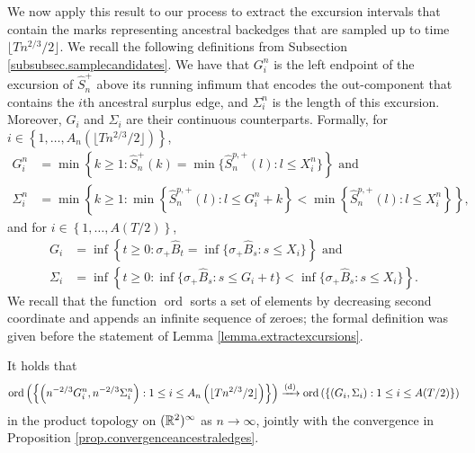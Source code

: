 We now apply this result to our process to extract the excursion intervals that contain the marks representing ancestral backedges that are sampled up to time $\lfloor Tn^{2/3}/2\rfloor$.  We recall the following definitions from Subsection  \ref{subsubsec.samplecandidates}. We have that $G_i^n$ is the left endpoint of the excursion of $\hat{S}_n^+$ above its running infimum that encodes the out-component that contains the $i$th ancestral surplus edge, and $\Sigma_i^n$ is the length of this excursion.  Moreover, $G_i$ and $\Sigma_i$ are their continuous counterparts. Formally, for $i\in \left\{1,\dots, A_n\left(\lfloor T n^{2/3}/2\rfloor\right)\right\}$, 
\begin{align*}G_i^n&=\min\left\{k\geq 1:\hat{S}^{+}_n(k)=\min\{\hat{S}^{p,+}_n(l):l\leq X_i^n\}\right\}\text{ and}\\
\Sigma_i^n&=\min\left\{k \geq 1: \min\left\{\hat{S}^{p,+}_n(l):l\leq G_i^n+k\right\} < \min\left\{\hat{S}^{p,+}_n(l):l\leq X_i^n\right\}\right\},
\end{align*}
and for $i\in \left\{1,\dots, A\left(T/2\right)\right\}$, 
\begin{align*}
G_i&=\inf\left\{t\geq 0:\sigma_+\hat{B}_t=\inf\{\sigma_+\hat{B}_s:s\leq X_i\}\right\}\text{ and}\\
\Sigma_i&=\inf\left\{ t\geq 0: \inf\{\sigma_+\hat{B}_s:s\leq G_i+t\} < \inf\{\sigma_+\hat{B}_s:s\leq X_i\}\right\}.
\end{align*}
We recall that the function $\operatorname{ord}$ sorts a set of elements by decreasing second coordinate and appends an infinite sequence of zeroes; the formal definition was given before the statement of Lemma \ref{lemma.extractexcursions}. 
\begin{proposition}\label{prop.extractexcursions}
It holds that
$$\operatorname{ord}\left(\left\{\left(n^{-2/3}G_i^n,n^{-2/3}\Sigma_i^n\right):1\leq i \leq A_n\left(\lfloor T n^{2/3}/2\rfloor\right)\right\}\right)\xrightarrow[]{\mathrm{(d)}} \operatorname{ord}\left(\left\{(G_i,\Sigma_i):1\leq i \leq A(T/2)\right\}\right)$$
in the product topology on $({\mathbb R}^2)^\infty$ as $n\to \infty$, jointly with the convergence in Proposition \ref{prop.convergenceancestraledges}. 
\end{proposition}
